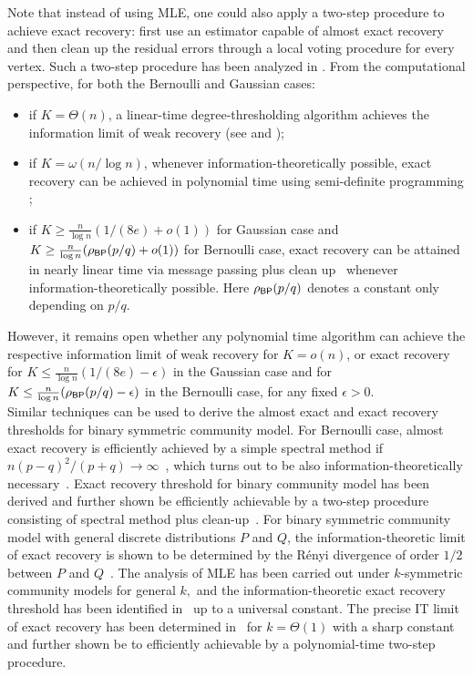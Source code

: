 \begin{remark}
Note that instead of using MLE, one could also apply a two-step procedure to achieve exact recovery: first use an estimator capable of almost exact recovery and then clean up the residual errors through a local voting procedure for
every vertex. Such a two-step procedure has been analyzed in \cite{HajekWuXu_one_info_lim15}.  From the 
computational perspective, for both the Bernoulli and Gaussian cases:
\begin{itemize}
\item if $K=\Theta(n)$, a linear-time degree-thresholding algorithm achieves the information limit of weak recovery (see 
\cite[Appendix A]{HajekWuXu_one_beyond_spectral15} and \cite[Appendix A]{HajekWuXu_MP_submat15});
\item if $K=\omega(n/\log n)$, whenever information-theoretically possible, exact recovery can
be achieved in polynomial time using  semi-definite programming \cite{HajekWuXu_one_sdp15};
\item if $K \geq \frac{n}{\log n} (1/(8e) + o(1))$ for Gaussian case and $K \geq \frac{n}{\log n} (\rho_{\sf BP}(p/q) + o(1))$
for Bernoulli case, exact recovery can be attained in nearly linear time via message passing plus clean up~\cite{HajekWuXu_one_beyond_spectral15,HajekWuXu_MP_submat15} whenever information-theoretically possible.
Here $\rho_{\sf BP} (p/q)$ denotes a constant only depending on $p/q$.
\end{itemize}
However, it remains open 
whether any polynomial time algorithm can achieve the respective information limit of weak recovery
for $K=o(n)$, or  exact recovery for $K \le \frac{n}{\log n} (1/(8e) -\epsilon)$ in the Gaussian case and 
for $K \le  \frac{n}{\log n} (\rho_{\sf BP}(p/q) -\epsilon)$ in the Bernoulli case, for any fixed $\epsilon>0$. \\


Similar techniques can be used to derive the almost exact and exact recovery 
thresholds for binary symmetric community model. For Bernoulli case,  
almost exact recovery  is efficiently achieved by a simple spectral method if $n(p-q)^2/(p+q) \to \infty$~\cite{yun2014adaptive},
which turns out to be also information-theoretically necessary~\cite{Mossel14}. 
Exact recovery threshold for binary community model has been derived 
and further shown be efficiently achievable by a two-step procedure consisting of 
spectral method plus clean-up~\cite{Abbe14,Mossel14}. 
For binary symmetric community model with general discrete distributions $P$ and $Q$, 
the information-theoretic limit of 
exact recovery is shown to be determined by the R\'enyi divergence of order $1/2$ between $P$ and 
$Q$~\cite{JL15}.
The analysis of MLE has been carried out under $k$-symmetric community models for general $k,$ and 
the information-theoretic exact recovery threshold has been identified in~\cite{ChenXu14} up to a universal
constant. The precise IT limit of exact recovery has been determined in~\cite{AbbeSandon15} for $k=\Theta(1)$ with
a sharp constant and further shown be to efficiently achievable by a polynomial-time two-step procedure. 
\end{remark}

